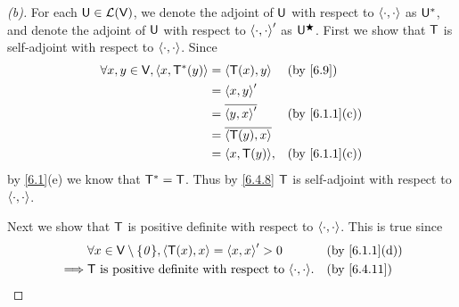 \begin{proof}[(b)]
  For each \(\mathsf{U} \in \mathcal{L}(\mathsf{V})\), we denote the adjoint of \(\mathsf{U}\) with respect to \(\left\langle\cdot, \cdot\right\rangle\) as \(\mathsf{U}^*\), and denote the adjoint of \(\mathsf{U}\) with respect to \(\left\langle\cdot, \cdot\right\rangle'\) as \(\mathsf{U}^{\bigstar}\).
  First we show that \(\mathsf{T}\) is self-adjoint with respect to \(\left\langle\cdot, \cdot\right\rangle\).
  Since
  \begin{align*}
    \forall x, y \in \V, \inn{x, \T^*(y)} & = \inn{\T(x), y}        &  & \by{6.9}      \\
                                          & = \inn{x, y}'                              \\
                                          & = \conj{\inn{y, x}'}    &  & \by{6.1.1}[c] \\
                                          & = \conj{\inn{\T(y), x}}                    \\
                                          & = \inn{x, \T(y)},       &  & \by{6.1.1}[c]
  \end{align*}
  by \cref{6.1}(e) we know that \(\mathsf{T}^* = \mathsf{T}\).
  Thus by \cref{6.4.8} \(\mathsf{T}\) is self-adjoint with respect to \(\left\langle\cdot, \cdot\right\rangle\).

  Next we show that \(\mathsf{T}\) is positive definite with respect to \(\left\langle\cdot, \cdot\right\rangle\).
  This is true since
  \begin{align*}
             & \forall x \in \V \setminus \set{\zv}, \inn{\T(x), x} = \inn{x, x}' > 0 &  & \by{6.1.1}[d] \\
    \implies & \T \text{ is positive definite with respect to } \inn{\cdot, \cdot}.   &  & \by{6.4.11}
  \end{align*}


\end{proof}
